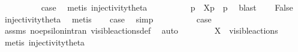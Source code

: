 \begin{isabellebody}
\ \ \isamarkupfalse%
\ {}\isanewline
\ \ \isamarkupfalse%
\ \isamarkupfalse%
\ {\isacharquery}{\kern0pt}case\ \isamarkupfalse%
\ {\isacharparenleft}{\kern0pt}metis\ injectivity{\isacharunderscore}{\kern0pt}theta{\isacharparenleft}{\kern0pt}{}{\isacharparenright}{\kern0pt}{\isacharparenright}{\kern0pt}\isanewline
{}\isamarkupfalse%
\isanewline
\ \ \isamarkupfalse%
\ {}\isanewline
\ \ \isamarkupfalse%
\ \isamarkupfalse%
\ p{\isacharprime}{\kern0pt}\ \ {\isacartoucheopen}{\isasymtheta}{\isacharbrackleft}{\kern0pt}X{\isacharbrackright}{\kern0pt}{\isacharparenleft}{\kern0pt}p{\isacharparenright}{\kern0pt}\ {\isacharequal}{\kern0pt}\ {\isasymtheta}{\isacharparenleft}{\kern0pt}p{\isacharprime}{\kern0pt}{\isacharparenright}{\kern0pt}{\isacartoucheclose}\ \isamarkupfalse%
\ blast\isanewline
\ \ \isamarkupfalse%
\ False\ \isamarkupfalse%
\ injectivity{\isacharunderscore}{\kern0pt}theta{\isacharparenleft}{\kern0pt}{}{\isacharparenright}{\kern0pt}\ \isamarkupfalse%
\ metis\isanewline
\ \ \isamarkupfalse%
\ {\isacharquery}{\kern0pt}case\ \isamarkupfalse%
\ simp\isanewline
{}\isamarkupfalse%
\isanewline
\ \ \isamarkupfalse%
\ {}\isanewline
\ \ \isamarkupfalse%
\ \isamarkupfalse%
\ {\isacharquery}{\kern0pt}case\ \isamarkupfalse%
\ assms{\isacharparenleft}{\kern0pt}{}{\isacharparenright}{\kern0pt}\ no{\isacharunderscore}{\kern0pt}epsilon{\isacharunderscore}{\kern0pt}in{\isacharunderscore}{\kern0pt}tran{\isacharparenleft}{\kern0pt}{}{\isacharparenright}{\kern0pt}\ visible{\isacharunderscore}{\kern0pt}actions{\isacharunderscore}{\kern0pt}def\ \isamarkupfalse%
\ auto\isanewline
{}\isamarkupfalse%
\isanewline
\ \ \isamarkupfalse%
\ {}\isanewline
\ \ \isamarkupfalse%
\ {\isacartoucheopen}X\ {\isasymsubseteq}\ visible{\isacharunderscore}{\kern0pt}actions{\isacartoucheclose}\ \isamarkupfalse%
\ {\isacharparenleft}{\kern0pt}metis\ injectivity{\isacharunderscore}{\kern0pt}theta{\isacharparenleft}{\kern0pt}{}{\isacharparenright}{\kern0pt}{\isacharparenright}{\kern0pt}\isanewline
\ \ \isamarkupfalse%
\ {}\ \isamarkupfalse%

\end{isabellebody}
